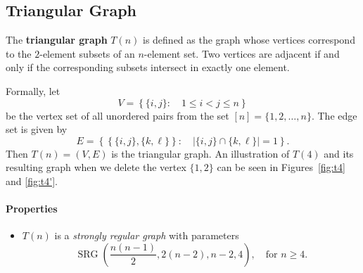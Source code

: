
    
\subsection{Triangular Graph}

The \textbf{triangular graph} \( T(n) \) is defined as the graph whose vertices correspond to the $2$-element subsets of an $n$-element set. Two vertices are adjacent if and only if the corresponding subsets intersect in exactly one element.

Formally, let
\[
V = \left\{ \{i,j\} :\quad 1 \le i < j \le n \right\}
\]
be the vertex set of all unordered pairs from the set $[n] = \{1, 2, \dots, n\}$. The edge set is given by
\[
E = \left\{ \left\{ \{i,j\}, \{k,\ell\} \right\} :\quad |\{i,j\} \cap \{k,\ell\}| = 1 \right\}.
\]
Then \( T(n) = (V, E) \) is the triangular graph. An illustration of $T(4)$ and its resulting graph when we delete the vertex $\{1,2\}$ can be seen in Figures~\ref{fig:t4} and \ref{fig:t4'}.

\paragraph{Properties}
\begin{itemize}
    \item \( T(n) \) is a \emph{strongly regular graph} with parameters
    \[
    \operatorname{SRG} \left( \frac{n(n-1)}{2}, 2(n-2), n-2, 4 \right), \quad \text{for } n \ge 4.
    \]
\end{itemize}
